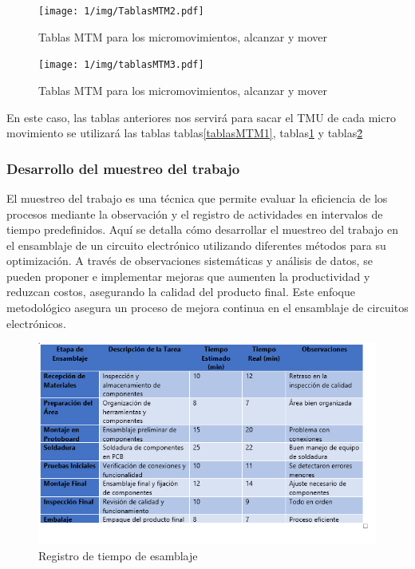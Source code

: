     
         \begin{figure}[H]
            \centering
            \texttt{[image: 1/img/TablasMTM2.pdf]}
            \caption{Tablas MTM para los micromovimientos, alcanzar y mover}
            \label{TablasMTM2}
        \end{figure}
    
    
         \begin{figure}[H]
            \centering
            \texttt{[image: 1/img/tablasMTM3.pdf]}
            \caption{Tablas MTM para los micromovimientos, alcanzar y mover}
            \label{tablasMTM3}
        \end{figure}
    
    En este caso, las tablas anteriores nos servirá para sacar el TMU de cada micro movimiento se utilizará las tablas tablas\ref{tablasMTM1}, tablas\ref{TablasMTM2} y tablas\ref{tablasMTM3}\.
    
    \subsubsection{Desarrollo del muestreo del trabajo}
    
    El muestreo del trabajo es una técnica que permite evaluar la eficiencia de los procesos mediante la observación y el registro de actividades en intervalos de tiempo predefinidos. Aquí se detalla cómo desarrollar el muestreo del trabajo en el ensamblaje de un circuito electrónico utilizando diferentes métodos para su optimización.
    A través de observaciones sistemáticas y análisis de datos, se pueden proponer e implementar mejoras que aumenten la productividad y reduzcan costos, asegurando la calidad del producto final. Este enfoque metodológico asegura un proceso de mejora continua en el ensamblaje de circuitos electrónicos.\cite{Niebel}
    \begin{figure}[H]
        \centering
        \includegraphics[scale=0.50]{1/img/Registro de tiempo de esamblaje.png}
        \caption{Registro de tiempo de esamblaje}
    \end{figure}
    
